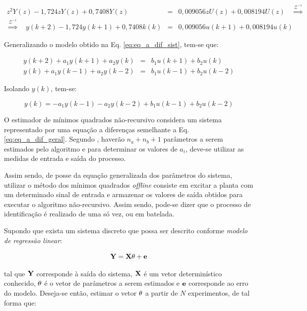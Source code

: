 \begin{eqnarray}
z^2Y(z) - 1,724zY(z) + 0,7408Y(z) & = & 0,009056zU(z) + 0,008194U(z)
\quad\stackrel{\mathcal{Z}^{-1}}{\Longrightarrow}\quad\nonumber\\
\stackrel{\mathcal{Z}^{-1}}{\Longrightarrow}\quad
y(k+2) - 1,724y(k+1) + 0,7408k(k) & = & 0,009056u(k+1) + 0,008194u(k)\label{eq:eq_a_dif_sist}
\end{eqnarray}

Generalizando o modelo obtido na Eq. \ref{eq:eq_a_dif_sist}, tem-se que:

\begin{eqnarray}
y(k+2) + a_1 y(k+1) + a_2 y(k) & = & b_1 u(k+1) + b_2 u(k)\nonumber\\
y(k) + a_1 y(k-1) + a_2 y(k-2) & = & b_1 u(k-1) + b_2u(k-2)\nonumber
\end{eqnarray}

Isolando $y(k)$, tem-se:

\begin{equation}\label{eq:eq_a_dif_geral}
y(k) = - a_1 y(k-1) - a_2 y(k-2) + b_1 u(k-1) + b_2u(k-2)
\end{equation}

O estimador de mínimos quadrados não-recursivo considera um sistema representado
por uma equação a diferenças semelhante a Eq. \ref{eq:eq_a_dif_geral}. Segundo
, haverão $n_a + n_b + 1$ parâmetros a serem estimados
pelo algoritmo e para determinar os valores de $a_i$, deve-se utilizar as
medidas de entrada e saída do processo.

Assim sendo, de posse da equação generalizada dos parâmetros do sistema,
utilizar o método dos mínimos quadrados {\it offline} consiste em excitar a
planta com um determinado sinal de entrada e armazenar os valores de saída
obtidos para executar o algoritmo não-recursivo. Assim sendo, pode-se dizer que
o processo de identificação é realizado de uma só vez, ou em batelada.

Supondo que exista um sistema discreto que possa ser descrito conforme {\it
modelo de regressão linear}:

\begin{equation}\label{eq:mode_reg_lin}
\mathbf{Y} = \mathbf{X\theta} + \mathbf{e}
\end{equation}

\noindent tal que $\mathbf{Y}$ corresponde à saída do sistema, $\mathbf{X}$ é um vetor
determinístico conhecido, $\mathbf{\theta}$ é o vetor de parâmetros a serem
estimados e $\mathbf{e}$ corresponde ao erro do modelo. Deseja-se então, estimar o
vetor $\mathbf{\theta}$ a partir de $N$ experimentos, de tal forma que:

